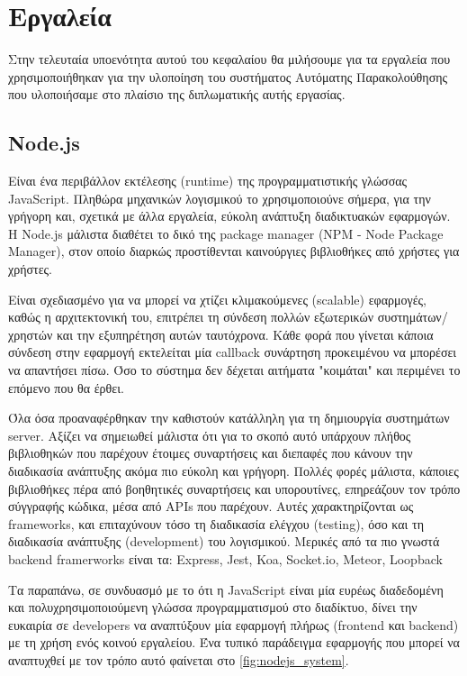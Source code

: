 \section{Εργαλεία}
\label{section:tools}

Στην τελευταία υποενότητα αυτού του κεφαλαίου θα μιλήσουμε για τα εργαλεία που χρησιμοποιήθηκαν
για την υλοποίηση του συστήματος Αυτόματης Παρακολούθησης που υλοποιήσαμε στο πλαίσιο της διπλωματικής
αυτής εργασίας.

\subsection{Node.js}
\label{subsec:nodejs}

Είναι ένα περιβάλλον εκτέλεσης (runtime) της προγραμματιστικής γλώσσας JavaScript.
Πληθώρα μηχανικών λογισμικού το χρησιμοποιούνε σήμερα, για την γρήγορη και, σχετικά με άλλα εργαλεία,
εύκολη ανάπτυξη διαδικτυακών εφαρμογών. Η Node.js μάλιστα διαθέτει το δικό της package manager
(ΝPM - Node Package Manager), στον οποίο διαρκώς προστίθενται καινούργιες βιβλιοθήκες
από χρήστες για χρήστες. 

Είναι σχεδιασμένο για να μπορεί να χτίζει κλιμακούμενες (scalable) εφαρμογές, καθώς η αρχιτεκτονική του,
επιτρέπει τη σύνδεση πολλών εξωτερικών συστημάτων/χρηστών και την εξυπηρέτηση αυτών ταυτόχρονα. Κάθε φορά που γίνεται κάποια σύνδεση στην εφαρμογή εκτελείται μία callback συνάρτηση προκειμένου να μπορέσει να απαντήσει πίσω.
Όσο το σύστημα δεν δέχεται αιτήματα "κοιμάται" και περιμένει το επόμενο που θα έρθει.

Όλα όσα προαναφέρθηκαν την καθιστούν κατάλληλη για τη δημιουργία συστημάτων server. Αξίζει να σημειωθεί μάλιστα ότι για το σκοπό
αυτό υπάρχουν πλήθος βιβλιοθηκών που παρέχουν έτοιμες συναρτήσεις και διεπαφές που κάνουν την διαδικασία ανάπτυξης ακόμα πιο εύκολη
και γρήγορη. Πολλές φορές μάλιστα, κάποιες βιβλιοθήκες πέρα από βοηθητικές συναρτήσεις και υπορουτίνες, επηρεάζουν τον τρόπο
σύγγραφής κώδικα, μέσα από APIs που παρέχουν. Αυτές χαρακτηρίζονται ως frameworks, και επιταχύνουν τόσο τη διαδικασία
ελέγχου (testing), όσο και τη διαδικασία ανάπτυξης (development) του λογισμικού. Μερικές από τα πιο γνωστά
backend framerworks είναι τα: Express, Jest, Koa, Socket.io, Meteor, Loopback

Τα παραπάνω, σε συνδυασμό με το ότι η JavaScript είναι μία ευρέως διαδεδομένη και πολυχρησιμοποιούμενη γλώσσα
προγραμματισμού στο διαδίκτυο, δίνει την ευκαιρία σε developers να αναπτύξουν μία εφαρμογή πλήρως
(frontend και backend) με τη χρήση ενός κοινού εργαλείου. Ένα τυπικό παράδειγμα εφαρμογής που μπορεί να
αναπτυχθεί με τον τρόπο αυτό φαίνεται στο \autoref{fig:nodejs_system}.

